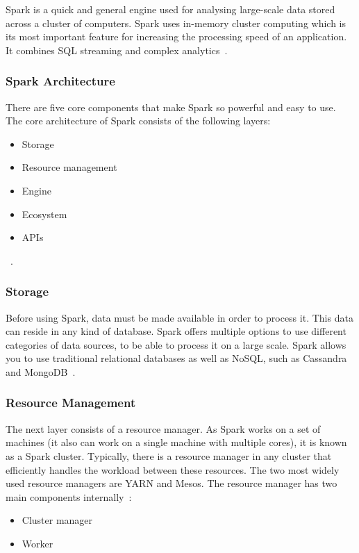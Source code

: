 \documentclass[]{final_report}
\begin{document}
Spark is a quick and general engine used for analysing large-scale data stored across a cluster of computers. Spark uses in-memory cluster computing which is its most important feature for increasing the processing speed of an application. It combines SQL streaming and complex analytics~\cite{hazarika_performance_2017}.

\subsubsection{Spark Architecture}

There are five core components that make Spark so powerful and easy to use. The core architecture of Spark consists of the following layers:

\begin{itemize}
    \item Storage
    \item Resource management
    \item Engine
    \item Ecosystem
    \item APIs
\end{itemize}
~\cite{singh_manage_2022}.

\subsubsection{Storage}
Before using Spark, data must be made available in order to process it. This data can reside in any kind of database. Spark offers multiple options to use different categories of data sources, to be able to process it on a large scale. Spark allows you to use traditional relational databases as well as NoSQL, such as Cassandra and MongoDB~\cite{singh_manage_2022}.
\clearpage

\subsubsection{Resource Management}
The next layer consists of a resource manager. As Spark works on a set of machines (it also can work on a single machine with multiple cores), it is known as a Spark cluster. Typically, there is a resource manager in any cluster that efficiently handles the workload between these resources. The two most widely used resource managers are YARN and Mesos. The resource manager has two main components internally~\cite{singh_manage_2022}:

\begin{itemize}
    \item Cluster manager
    \item Worker
\end{itemize}
\end{document}
